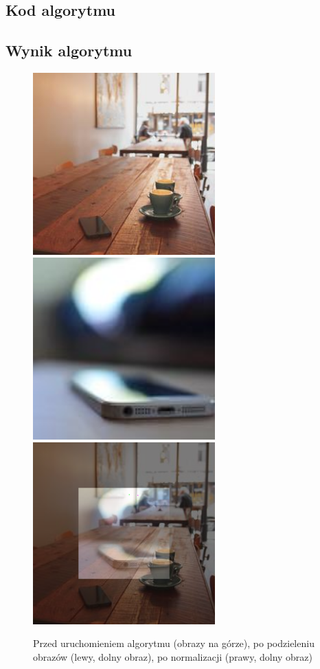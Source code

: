 \documentclass[a4paper,12pt]{book}
\begin{document}
\subsection*{Kod algorytmu}

\subsection*{Wynik algorytmu}
\begin{figure}[H]
	\caption{Przed uruchomieniem algorytmu (obrazy na górze), po podzieleniu obrazów (lewy, dolny obraz), po normalizacji (prawy, dolny obraz)}
	\includegraphics[width=7cm, height=7cm]{coffee-unmodified.jpg}
	\includegraphics[width=7cm, height=7cm]{phone-unmodified.jpg}
	\includegraphics[width=7cm, height=7cm]{3-5/divide-color-images-coffee-phone.png}

\end{figure}
\end{document}
